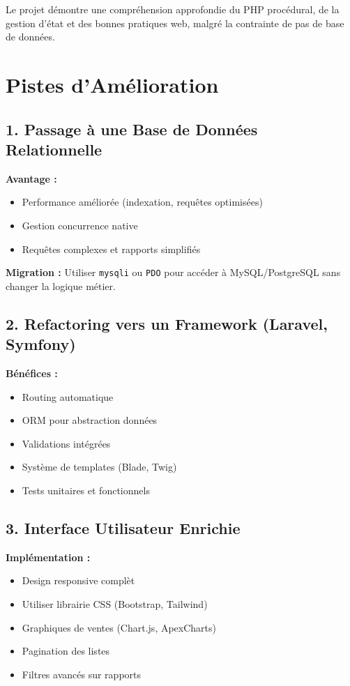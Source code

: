 \documentclass[12pt,a4paper]{report}
\begin{document}
Le projet démontre une compréhension approfondie du PHP procédural, de la gestion d'état et des bonnes pratiques web, malgré la contrainte de pas de base de données.

\section{Pistes d'Amélioration}

\subsection{1. Passage à une Base de Données Relationnelle}

\textbf{Avantage :}
\begin{itemize}
    \item Performance améliorée (indexation, requêtes optimisées)
    \item Gestion concurrence native
    \item Requêtes complexes et rapports simplifiés
\end{itemize}

\textbf{Migration :}
Utiliser \texttt{mysqli} ou \texttt{PDO} pour accéder à MySQL/PostgreSQL sans changer la logique métier.

\subsection{2. Refactoring vers un Framework (Laravel, Symfony)}

\textbf{Bénéfices :}
\begin{itemize}
    \item Routing automatique
    \item ORM pour abstraction données
    \item Validations intégrées
    \item Système de templates (Blade, Twig)
    \item Tests unitaires et fonctionnels
\end{itemize}

\subsection{3. Interface Utilisateur Enrichie}

\textbf{Implémentation :}
\begin{itemize}
    \item Design responsive complèt
    \item Utiliser librairie CSS (Bootstrap, Tailwind)
    \item Graphiques de ventes (Chart.js, ApexCharts)
    \item Pagination des listes
    \item Filtres avancés sur rapports
\end{itemize}
\end{document}
